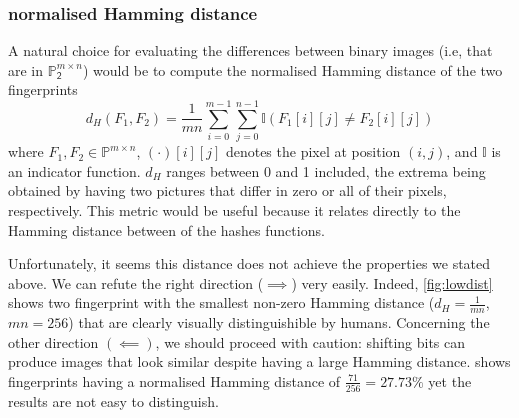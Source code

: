\documentclass{article}
\newcommand{\bb}{\mathbb}
\newcommand{\pb}{\bb P _ \mathsf{2}}
\begin{document}
\subsubsection{normalised Hamming distance}
A natural choice for evaluating the differences between binary images (i.e, that are in $\pb^{m\times n}$) would be to compute the normalised Hamming distance of the two fingerprints
$$d_H(F_1,F_2) = \frac{1}{mn} \sum\limits_{i=0}^{m-1}\sum\limits_{j=0}^{n-1} \mathbb{I}(F_1[i][j] \neq F_2[i][j])$$ where $F_1, F_2 \in \mathbb{P}^{m \times n}$, $(\cdot)[i][j]$ denotes the pixel at position $(i,j)$, and $\mathbb I$ is an indicator function. $d_H$ ranges between 0 and 1 included, the extrema being obtained by having two pictures that differ in zero or all of their pixels, respectively. This metric would be useful because it relates directly to the Hamming distance between of the hashes functions.

Unfortunately, it seems this distance does not achieve the properties we stated above. 
We can refute the right direction ($\implies$) very easily. Indeed, \cref{fig:lowdist} shows two fingerprint with the smallest non-zero Hamming distance ($d_H = \frac{1}{mn}$, $mn = 256$) that are clearly visually distinguishible by humans. Concerning the other direction $(\impliedby)$, we should proceed with caution: shifting bits can produce images that look similar despite having a large Hamming distance. 
 shows fingerprints having a normalised Hamming distance of $\frac{71}{256} = 27.73\%$ yet the results are not easy to distinguish.
\end{document}
